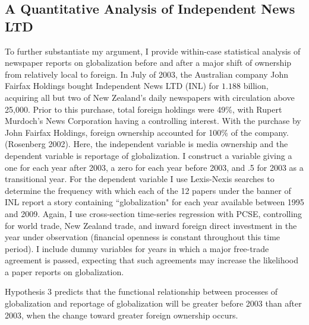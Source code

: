 \documentclass[12pt]{report}
\begin{document}
\subsection{A Quantitative Analysis of Independent News LTD}
	To further substantiate my argument, I provide within-case statistical analysis of newspaper reports on globalization before and after a major shift of ownership from relatively local to foreign. In July of 2003, the Australian company John Fairfax Holdings bought Independent News LTD (INL) for $1.188$ billion, acquiring all but two of New Zealand's daily newspapers with circulation above 25,000. Prior to this purchase, total foreign holdings were 49\%, with Rupert Murdoch's News Corporation having a controlling interest. With the purchase by John Fairfax Holdings, foreign ownership accounted for 100\% of the company. (Rosenberg 2002).
	Here, the independent variable is media ownership and the dependent variable is reportage of globalization. I construct a variable giving a one for each year after 2003, a zero for each year before 2003, and .5 for 2003 as a transitional year. For the dependent variable I use Lexis-Nexis searches to determine the frequency with which each of the 12 papers under the banner of INL report a story containing ``globalization" for each year available between 1995 and 2009. Again, I use cross-section time-series regression with PCSE, controlling for world trade, New Zealand trade, and inward foreign direct investment in the year under observation (financial openness is constant throughout this time period). I include dummy variables for years in which a major free-trade agreement is passed, expecting that such agreements may increase the likelihood a paper reports on globalization.
	
	Hypothesis 3 predicts that the functional relationship between processes of globalization and reportage of globalization will be greater before 2003 than after 2003, when the change toward greater foreign ownership occurs.
	
\end{document}
